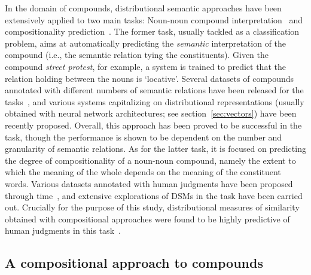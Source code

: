 \documentclass[output=paper]{langsci/langscibook}
\begin{document}
In the domain of compounds, distributional semantic approaches have been extensively applied to two main tasks: Noun-noun compound interpretation~\citep{van2013melodi,dima2015automatic,dima2016compositionality,P18-1111,fares2018transfer} and compositionality prediction~\citep{reddy2011empirical,im2013exploring,salehi2014using,salehi2015word,cordeiro2016predicting}. The former task, usually tackled as a classification problem, aims at automatically predicting the \emph{semantic} interpretation of the compound (i.e., the semantic relation tying the constituents). Given the compound \emph{street protest}, for example, a system is trained to predict that the relation holding between the nouns is `locative'. Several datasets of compounds annotated with different numbers of semantic relations have been released for the tasks~\citep{o2007annotating,tratz2010taxonomy}, and various systems capitalizing on distributional representations (usually obtained with neural network architectures; see section~\ref{sec:vectors}) have been recently proposed. Overall, this approach has been proved to be successful in the task, though the performance is shown to be dependent on the number and granularity of semantic relations. As for the latter task, it is focused on predicting the degree of compositionality of a noun-noun compound, namely the extent to which the meaning of the whole depends on the meaning of the constituent words. Various datasets annotated with human judgments have been proposed through time~\citep{reddy2011empirical,roller2013expected,farahmand2015multiword}, and extensive explorations of DSMs in the task have been carried out. Crucially for the purpose of this study, distributional measures of similarity obtained with compositional approaches were found to be highly predictive of human judgments in this task~\citep{reddy2011empirical,im2013exploring,salehi2015word,cordeiro2016predicting}.

\subsection{A compositional approach to compounds}\label{sec:compapp}
\end{document}
